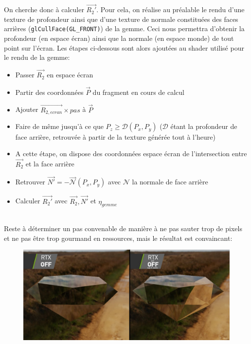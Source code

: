 \documentclass[a4paper,12pt]{article}
\begin{document}
On cherche donc à calculer $\overrightarrow{R_2'}$. Pour cela, on réalise au préalable le rendu d'une texture de profondeur ainsi
que d'une texture de normale constituées des faces arrières (\texttt{glCullFace(GL\_FRONT)}) de la gemme. Ceci nous permettra d'obtenir
la profondeur (en espace écran) ainsi que la normale (en espace monde) de tout point sur l'écran. Les étapes ci-dessous sont alors ajoutées
au shader utilisé pour le rendu de la gemme:
\begin{itemize}
    \item Passer $\overrightarrow{R_2}$ en espace écran
    \item Partir des coordonnées $\overrightarrow{P}$ du fragment en cours de calcul
    \item Ajouter $\overrightarrow{R_{2,ecran}}\times pas$ à $\overrightarrow{P}$
    \item Faire de même jusqu'à ce que $P_z \geq \mathcal{D}(P_x, P_y)$ ($\mathcal{D}$ étant la profondeur de face arrière, retrouvée à partir de la texture générée tout à l'heure)
    \item A cette étape, on dispose des coordonnées espace écran de l'intersection entre $\overrightarrow{R_2}$ et la face arrière
    \item Retrouver $\overrightarrow{N'} = -\overrightarrow{\mathcal{N}}(P_x, P_y)$ avec $\mathcal{N}$ la normale de face arrière
    \item Calculer $\overrightarrow{R_2'}$ avec $\overrightarrow{R_2}, \overrightarrow{N'}$ et $\eta_{gemme}$
\end{itemize}

\ \\
Reste à déterminer un pas convenable de manière à ne pas sauter trop de pixels et ne pas être
trop gourmand en ressources, mais le résultat est convaincant:
\begin{figure}[H]
    \centering
    \includegraphics[width=14cm]{intref_cmp.jpg}
\end{figure}
\end{document}
